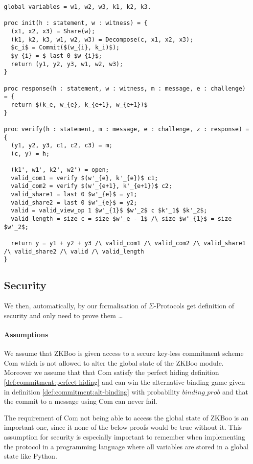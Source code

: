 \begin{lstlisting}[float, mathescape,label=lst:zkboo_procedures,caption= ZKBoo $\Sigma$-Protocol instantiation]
global variables = w1, w2, w3, k1, k2, k3.

proc init(h : statement, w : witness) = {
  (x1, x2, x3) = Share(w);
  (k1, k2, k3, w1, w2, w3) = Decompose(c, x1, x2, x3);
  $c_i$ = Commit($(w_{i}, k_i)$);
  $y_{i} = $ last 0 $w_{i}$;
  return (y1, y2, y3, w1, w2, w3);
}

proc response(h : statement, w : witness, m : message, e : challenge) = {
  return $(k_e, w_{e}, k_{e+1}, w_{e+1})$
}

proc verify(h : statement, m : message, e : challenge, z : response) = {
  (y1, y2, y3, c1, c2, c3) = m;
  (c, y) = h;

  (k1', w1', k2', w2') = open;
  valid_com1 = verify $(w'_{e}, k'_{e})$ c1;
  valid_com2 = verify $(w'_{e+1}, k'_{e+1})$ c2;
  valid_share1 = last 0 $w'_{e}$ = y1;
  valid_share2 = last 0 $w'_{e}$ = y2;
  valid = valid_view_op 1 $w'_{1}$ $w'_2$ c $k'_1$ $k'_2$;
  valid_length = size c = size $w'_e - 1$ /\ size $w'_{1}$ = size $w'_2$;

  return y = y1 + y2 + y3 /\ valid_com1 /\ valid_com2 /\ valid_share1 /\ valid_share2 /\ valid /\ valid_length
}

\end{lstlisting}

\subsection{Security}
\label{subsec:zkboo:sec}
We then, automatically, by our formalisation of $\Sigma$-Protocols get
definition of security and only need to prove them \dots {}

\paragraph{Assumptions}
We assume that ZKBoo is given access to a secure key-less commitment scheme Com
which is not allowed to alter the global state of the ZKBoo module. Moreover we
assume that that Com satisfy the perfect hiding definition
\ref{def:commitment:perfect-hiding} and can win the alternative binding game
given in definition \ref{def:commitment:alt-binding} with probability
$binding\_{prob}$ and that the commit to a message using Com can never fail.

The requirement of Com not being able to access the global state of ZKBoo is an
important one, since it none of the below proofs would be true without it. This
assumption for security is especially important to remember when implementing
the protocol in a programming language where all variables are stored in a
global state like Python.

